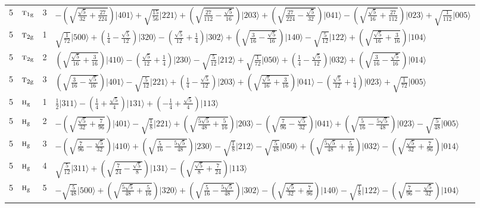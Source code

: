 \documentclass[11pt]{article}
\newcommand{\irr}[1]{\text{\normalfont\scshape #1}}
\newcommand{\ptag}[1]{\mathrm{#1}}
\newcommand{\occ}[1]{\lvert #1\rangle}
\begin{document}
\begin{longtable}{c l c p{}}
5 & $\irr{t}_{1\ptag{g}}$ & 3 & $-(\sqrt{\frac{\sqrt{5}}{32} + \frac{27}{224}})\occ{401}+\sqrt{\tfrac{15}{56}}\occ{221}+(\sqrt{\frac{27}{112} - \frac{\sqrt{5}}{16}})\occ{203}+(\sqrt{\frac{27}{224} - \frac{\sqrt{5}}{32}})\occ{041}-(\sqrt{\frac{\sqrt{5}}{16} + \frac{27}{112}})\occ{023}+\sqrt{\tfrac{1}{112}}\occ{005}$\\
5 & $\irr{t}_{2\ptag{g}}$ & 1 & $\sqrt{\tfrac{1}{72}}\occ{500}+(\frac{1}{4} - \frac{\sqrt{5}}{12})\occ{320}-(\frac{\sqrt{5}}{12} + \frac{1}{4})\occ{302}+(\sqrt{\frac{3}{16} - \frac{\sqrt{5}}{16}})\occ{140}-\sqrt{\tfrac{5}{12}}\occ{122}+(\sqrt{\frac{\sqrt{5}}{16} + \frac{3}{16}})\occ{104}$\\
5 & $\irr{t}_{2\ptag{g}}$ & 2 & $(\sqrt{\frac{\sqrt{5}}{16} + \frac{3}{16}})\occ{410}-(\frac{\sqrt{5}}{12} + \frac{1}{4})\occ{230}-\sqrt{\tfrac{5}{12}}\occ{212}+\sqrt{\tfrac{1}{72}}\occ{050}+(\frac{1}{4} - \frac{\sqrt{5}}{12})\occ{032}+(\sqrt{\frac{3}{16} - \frac{\sqrt{5}}{16}})\occ{014}$\\
5 & $\irr{t}_{2\ptag{g}}$ & 3 & $(\sqrt{\frac{3}{16} - \frac{\sqrt{5}}{16}})\occ{401}-\sqrt{\tfrac{5}{12}}\occ{221}+(\frac{1}{4} - \frac{\sqrt{5}}{12})\occ{203}+(\sqrt{\frac{\sqrt{5}}{16} + \frac{3}{16}})\occ{041}-(\frac{\sqrt{5}}{12} + \frac{1}{4})\occ{023}+\sqrt{\tfrac{1}{72}}\occ{005}$\\
5 & $\irr{h}_{\ptag{g}}$ & 1 & $\tfrac{1}{2}\occ{311}-(\frac{1}{4} + \frac{\sqrt{5}}{4})\occ{131}+(- \frac{1}{4} + \frac{\sqrt{5}}{4})\occ{113}$\\
5 & $\irr{h}_{\ptag{g}}$ & 2 & $-(\sqrt{\frac{\sqrt{5}}{32} + \frac{7}{96}})\occ{401}-\sqrt{\tfrac{1}{8}}\occ{221}+(\sqrt{\frac{5 \sqrt{5}}{48} + \frac{5}{16}})\occ{203}-(\sqrt{\frac{7}{96} - \frac{\sqrt{5}}{32}})\occ{041}+(\sqrt{\frac{5}{16} - \frac{5 \sqrt{5}}{48}})\occ{023}-\sqrt{\tfrac{5}{48}}\occ{005}$\\
5 & $\irr{h}_{\ptag{g}}$ & 3 & $-(\sqrt{\frac{7}{96} - \frac{\sqrt{5}}{32}})\occ{410}+(\sqrt{\frac{5}{16} - \frac{5 \sqrt{5}}{48}})\occ{230}-\sqrt{\tfrac{1}{8}}\occ{212}-\sqrt{\tfrac{5}{48}}\occ{050}+(\sqrt{\frac{5 \sqrt{5}}{48} + \frac{5}{16}})\occ{032}-(\sqrt{\frac{\sqrt{5}}{32} + \frac{7}{96}})\occ{014}$\\
5 & $\irr{h}_{\ptag{g}}$ & 4 & $\sqrt{\tfrac{5}{12}}\occ{311}+(\sqrt{\frac{7}{24} - \frac{\sqrt{5}}{8}})\occ{131}-(\sqrt{\frac{\sqrt{5}}{8} + \frac{7}{24}})\occ{113}$\\
5 & $\irr{h}_{\ptag{g}}$ & 5 & $-\sqrt{\tfrac{5}{48}}\occ{500}+(\sqrt{\frac{5 \sqrt{5}}{48} + \frac{5}{16}})\occ{320}+(\sqrt{\frac{5}{16} - \frac{5 \sqrt{5}}{48}})\occ{302}-(\sqrt{\frac{\sqrt{5}}{32} + \frac{7}{96}})\occ{140}-\sqrt{\tfrac{1}{8}}\occ{122}-(\sqrt{\frac{7}{96} - \frac{\sqrt{5}}{32}})\occ{104}$\\

\end{longtable}
\end{document}
